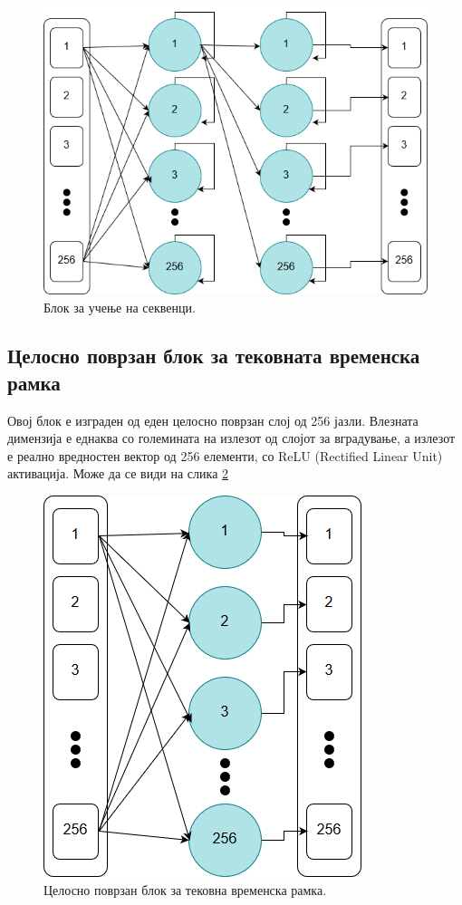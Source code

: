 \begin{figure}[H]
	\centering
    \includegraphics[scale=0.5]{images/lstm_block.png}
	\caption{Блок за учење на секвенци.}
	\label{fig:lstm_block}
\end{figure}

\subsection{Целосно поврзан блок за тековната временска рамка}

Овој блок е изграден од еден целосно поврзан слој од 256 јазли. Влезната димензија е еднаква со големината на излезот од слојот за вградување, а излезот е реално вредностен вектор од 256 елементи, со ReLU (Rectified Linear Unit) активација. Може да се види на слика \ref{fig:fully_connected_block}

\begin{figure}[H]
	\centering
    \includegraphics[scale=0.5]{images/fully_connected.png}
	\caption{Целосно поврзан блок за тековна временска рамка.}
	\label{fig:fully_connected_block}
\end{figure}


